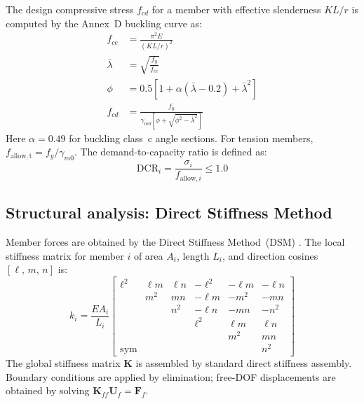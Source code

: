 \documentclass[lineno,pdflatex,sn-mathphys-num]{sn-jnl}
\begin{document}
The design compressive stress $f_{cd}$ for a member with effective
slenderness $KL/r$ is computed by the Annex~D buckling curve as:
\begin{align}
  f_{cc} &= \frac{\pi^2 E}{(KL/r)^2}
    \label{eq:fcc} \\
  \bar{\lambda} &= \sqrt{\frac{f_y}{f_{cc}}}
    \label{eq:lambda} \\
  \phi &= 0.5\!\left[1 + \alpha\!\left(\bar{\lambda}-0.2\right)
          + \bar{\lambda}^2\right]
    \label{eq:phi} \\
  f_{cd} &= \frac{f_y}{\gamma_{m0}
    \!\left[\phi + \sqrt{\phi^2 - \bar{\lambda}^2}\right]}
    \label{eq:fcd}
\end{align}
Here $\alpha=0.49$ for buckling class~c angle sections.
For tension members, $f_{\mathrm{allow,t}} = f_y/\gamma_{m0}$.
The demand-to-capacity ratio is defined as:
\begin{equation}
  \mathrm{DCR}_i = \frac{\sigma_i}{f_{\mathrm{allow},i}} \leq 1.0
  \label{eq:dcr}
\end{equation}

\subsection{Structural analysis: Direct Stiffness Method}

Member forces are obtained by the Direct Stiffness Method~(DSM)
\citep{McGuire2000}.
The local stiffness matrix for member $i$ of area $A_i$, length $L_i$,
and direction cosines $[\ell,\,m,\,n]$ is:
\begin{equation}
  k_i = \frac{EA_i}{L_i}
  \begin{bmatrix}
    \ell^2 & \ell m & \ell n & -\ell^2 & -\ell m & -\ell n \\
    & m^2 & mn & -\ell m & -m^2 & -mn \\
    & & n^2 & -\ell n & -mn & -n^2 \\
    & & & \ell^2 & \ell m & \ell n \\
    & & & & m^2 & mn \\
    \text{sym} & & & & & n^2
  \end{bmatrix}
  \label{eq:klocal}
\end{equation}
The global stiffness matrix $\mathbf{K}$ is assembled by standard
direct stiffness assembly.
Boundary conditions are applied by elimination; free-DOF displacements
are obtained by solving $\mathbf{K}_{ff}\mathbf{U}_f = \mathbf{F}_f$.


\end{document}
